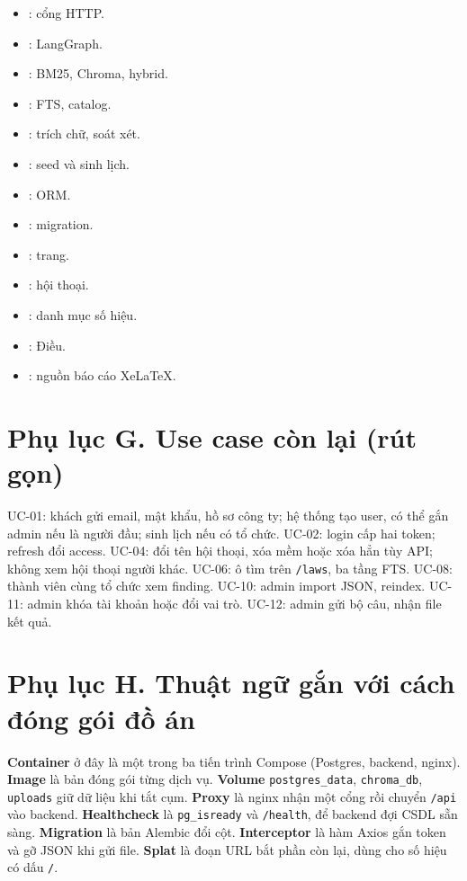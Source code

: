 \begin{itemize}
    \item {}: cổng HTTP.
    \item {}: LangGraph.
    \item {}: BM25, Chroma, hybrid.
    \item {}: FTS, catalog.
    \item {}: trích chữ, soát xét.
    \item {}: seed và sinh lịch.
    \item {}: ORM.
    \item {}: migration.
    \item {}: trang.
    \item {}: hội thoại.
    \item {}: danh mục số hiệu.
    \item {}: Điều.
    \item {}: nguồn báo cáo XeLaTeX.
\end{itemize}

\section*{Phụ lục G. Use case còn lại (rút gọn)}

UC-01: khách gửi email, mật khẩu, hồ sơ công ty; hệ thống tạo user, có thể gắn
admin nếu là người đầu; sinh lịch nếu có tổ chức. UC-02: login cấp hai token;
refresh đổi access. UC-04: đổi tên hội thoại, xóa mềm hoặc xóa hẳn tùy API; không
xem hội thoại người khác. UC-06: ô tìm trên \texttt{/laws}, ba tầng FTS. UC-08:
thành viên cùng tổ chức xem finding. UC-10: admin import JSON, reindex. UC-11:
admin khóa tài khoản hoặc đổi vai trò. UC-12: admin gửi bộ câu, nhận file kết quả.

\section*{Phụ lục H. Thuật ngữ gắn với cách đóng gói đồ án}

\textbf{Container} ở đây là một trong ba tiến trình Compose (Postgres, backend,
nginx). \textbf{Image} là bản đóng gói từng dịch vụ. \textbf{Volume}
\texttt{postgres\_data}, \texttt{chroma\_db}, \texttt{uploads} giữ dữ liệu khi
tắt cụm. \textbf{Proxy} là nginx nhận một cổng rồi chuyển \texttt{/api} vào
backend. \textbf{Healthcheck} là \texttt{pg\_isready} và \texttt{/health}, để
backend đợi CSDL sẵn sàng. \textbf{Migration} là bản Alembic đổi cột.
\textbf{Interceptor} là hàm Axios gắn token và gỡ JSON khi gửi file.
\textbf{Splat} là đoạn URL bắt phần còn lại, dùng cho số hiệu có dấu \texttt{/}.



